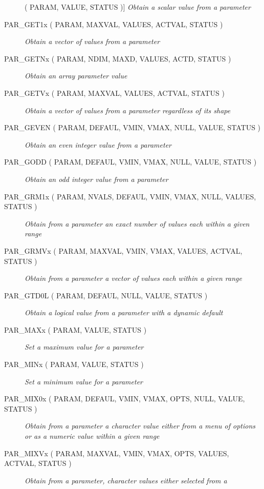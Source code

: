 \documentclass[twoside,11pt]{article}
\newcommand{\htmlref}[2]{#1}
\newcommand{\listline}{\hspace{1pt}\\}
\newcommand{\listova}[1]{}
\newcommand{\listovb}[1]{\textbf{#1}\\}
\renewcommand{\listline}{}
\renewcommand{\listova}[1]{#1}
\renewcommand{\listovb}[1]{}
\begin{document}
\begin{description}
( PARAM, VALUE, STATUS )] \listline
\textit{Obtain a scalar value from a parameter}
\item [\htmlref{PAR\_GET1x}{PAR_GET1x} 
( PARAM, MAXVAL, VALUES, ACTVAL, STATUS )] \listline
\textit{Obtain a vector of values from a parameter}
\item [\htmlref{PAR\_GETNx}{PAR_GETNx} 
( PARAM, NDIM, MAXD, VALUES, ACTD, STATUS )] \listline
\textit{Obtain an array parameter value}
\item [\htmlref{PAR\_GETVx}{PAR_GETVx} 
( PARAM, MAXVAL, VALUES, ACTVAL, STATUS )] \listline
\textit{Obtain a vector of values from a parameter regardless of its shape}
\item [\htmlref{PAR\_GEVEN}{PAR_GEVEN} 
( PARAM, DEFAUL, VMIN, VMAX, NULL, VALUE, STATUS )] \listline
\textit{Obtain an even integer value from a parameter}
\item [\htmlref{PAR\_GODD}{PAR_GODD} 
( PARAM, DEFAUL, VMIN, VMAX, NULL, VALUE, STATUS )] \listline
\textit{Obtain an odd integer value from a parameter}
\item [\htmlref{PAR\_GRM1x}{PAR_GRM1x} 
( PARAM, NVALS, DEFAUL, VMIN, VMAX, NULL, VALUES, \listova{STATUS )}] \listline
\listovb{STATUS )}
\textit{Obtain from a parameter an exact number of values each within a
            given range}
\item [\htmlref{PAR\_GRMVx}{PAR_GRMVx} 
( PARAM, MAXVAL, VMIN, VMAX, VALUES, ACTVAL, STATUS )] \listline
\textit{Obtain from a parameter a vector of values each within a given
            range}
\item [\htmlref{PAR\_GTD0L}{PAR_GTD0L} 
( PARAM, DEFAUL, NULL, VALUE, STATUS )] \listline
\textit{Obtain a logical value from a parameter with a dynamic default}
\item [\htmlref{PAR\_MAXx}{PAR_MAXx} 
( PARAM, VALUE, STATUS )] \listline
\textit{Set a maximum value for a parameter}
\item [\htmlref{PAR\_MINx}{PAR_MINx} 
( PARAM, VALUE, STATUS )] \listline
\textit{Set a minimum value for a parameter}
\item [\htmlref{PAR\_MIX0x}{PAR_MIX0x} 
( PARAM, DEFAUL, VMIN, VMAX, OPTS, NULL, VALUE, STATUS )] \listline
\textit{Obtain from a parameter a character value either from a menu of
            options or as a numeric value within a given range}
\item [\htmlref{PAR\_MIXVx}{PAR_MIXVx} 
( PARAM, MAXVAL, VMIN, VMAX, OPTS, VALUES, ACTVAL, \listova{STATUS )}] \listline
\listovb{STATUS )}
\textit{Obtain from a parameter, character values either selected from a
}
\end{description}
\end{document}
